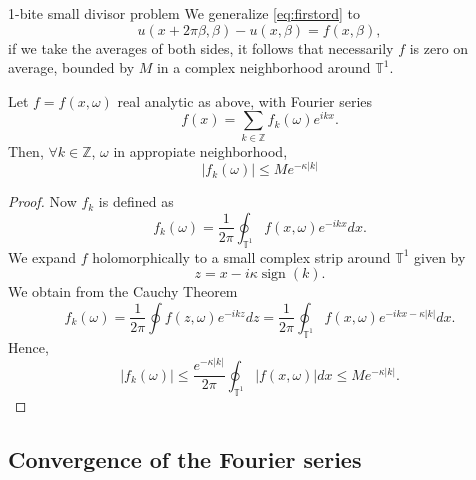 \documentclass[]{beamer}
\newcommand{\be}{\beta}
\newcommand{\om}{\omega}
\newcommand{\T}{\mathbb{T}}
\begin{document}
\begin{frame}{1-bite small divisor problem}
    We generalize \eqref{eq:firstord} to
    \begin{equation}\label{eq:lin}
        u(x + 2 \pi \be, \be) - u(x, \be) = f(x,\be),
    \end{equation}
    if we take the averages of both sides, it follows
    that necessarily $f$ is zero on average,
    bounded by $M$ in a complex neighborhood around $\T^1$.
\pause
    \begin{lemma}
        Let $f = f(x,\om)$ real analytic as above, with Fourier series
        \begin{equation*}
            f(x) = \sum_{k \in \mathbb{Z}} f_k(\om)e^{ikx}.
        \end{equation*}
        Then, $\forall k \in \mathbb{Z}$, $\om$ in appropiate neighborhood,
	\begin{equation*}
	    |f_k(\om)| \le M e^{-\kappa |k|}
	\end{equation*}
    \end{lemma}
\end{frame}

\begin{frame}

\begin{proof}
    Now $f_k$ is defined as
    \begin{equation*}
        f_k(\om) = \frac{1}{2\pi} \oint_{\T^1} f(x,\om)e^{-ikx} dx.
    \end{equation*}
    We expand $f$ holomorphically to a small complex strip around $\T^1$ given by
    \begin{equation*}
        z = x - i \kappa \operatorname{sign}(k).
    \end{equation*}
    \pause
    We obtain from the Cauchy Theorem
    \begin{equation*}
        f_k(\om) = \frac{1}{2\pi} \oint f(z,\om)e^{-ikz} dz
        = \frac{1}{2\pi} \oint_{\T^1} f(x,\om)e^{-ikx - \kappa|k|} dx.
    \end{equation*}
    Hence,
	\begin{equation*}
	    |f_k(\om)| \le \frac{e^{- \kappa|k|}}{2\pi} \oint_{\T^1} |f(x,\om)| dx \le M e^{-\kappa |k|}.
	\end{equation*}
\end{proof}
\end{frame}

\subsection{Convergence of the Fourier series}
\end{document}
